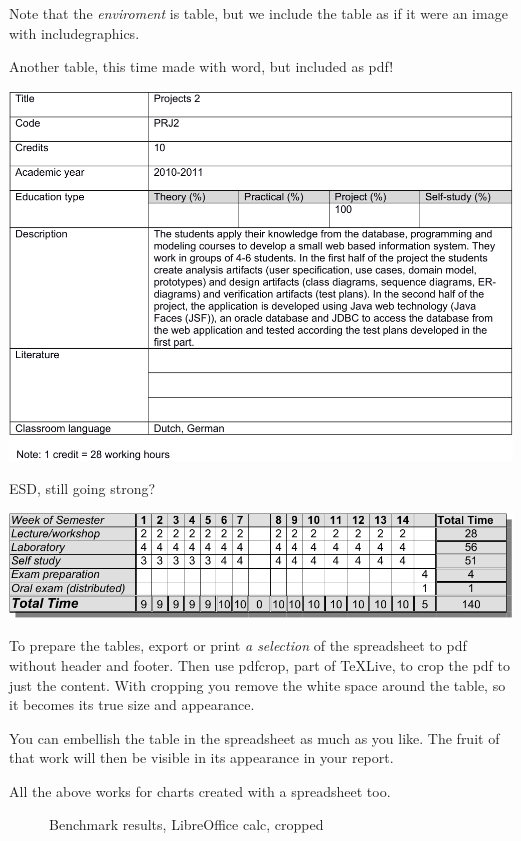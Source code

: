 Note that the \textit{enviroment} is table, but we include the table as if it were an image with includegraphics.

\begin{table}
  \caption{Another table, this time made with word, but included as pdf!}
\includegraphics[width=\linewidth]{tables/md_prj2-crop.pdf}   
\end{table}

\begin{table}
  \caption{ESD, still going strong?}
\includegraphics{tables/timetable-crop.pdf}
\end{table}


To prepare the tables, export or print \textit{a selection} of the spreadsheet to pdf without header and footer.
Then use pdfcrop, part of TeXLive, to crop the pdf to just the content. With cropping you remove the white space around the table, so it becomes its true size and appearance.

You can embellish the table in the spreadsheet as much as you like. The fruit of that work will then be visible in its appearance in your report.

All the above works for charts created with a spreadsheet too.

\begin{figure}
  \centering
{}
  \caption{Benchmark results, LibreOffice calc, cropped}
\end{figure}


